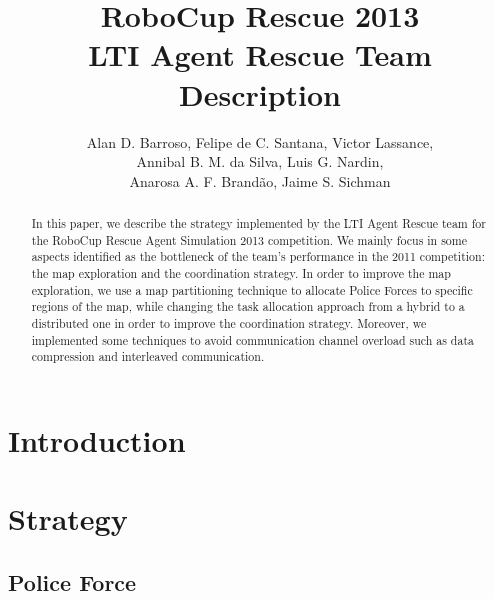 \documentclass{llncs}
\begin{document}
\title{RoboCup Rescue 2013\\
       LTI Agent Rescue Team Description}
\author{Alan D. Barroso, Felipe de C. Santana, Victor Lassance,\\
		Annibal B. M. da Silva, Luis G. Nardin,\\
        Anarosa A. F. Brandão, Jaime S. Sichman}
\maketitle
\begin{abstract}
In this paper, we describe the strategy implemented by the LTI Agent Rescue team for the RoboCup Rescue Agent Simulation 2013 competition. We mainly focus in some aspects identified as the bottleneck of the team's performance in the 2011 competition: the map exploration and the coordination strategy. In order to improve the map exploration, we use a map partitioning technique to allocate Police Forces to specific regions of the map, while changing the task allocation approach from a hybrid to a distributed one in order to improve the coordination strategy. Moreover, we implemented some techniques to avoid communication channel overload such as data compression and interleaved communication.
\end{abstract}
\section{Introduction}
	\label{sec:introduction}
	

\section{Strategy}
	\label{sec:strategy}
	

\subsection{Police Force}
	\label{subsec:policeForce}
	
\end{document}
